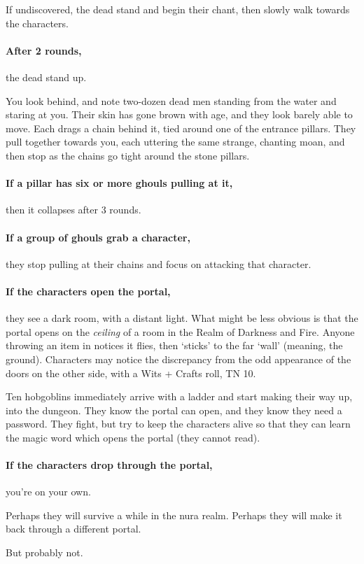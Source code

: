 If undiscovered, the dead stand and begin their chant, then slowly walk towards the characters.

\paragraph{After 2 rounds,}
the dead stand up.

\begin{boxtext}

  You look behind, and note two-dozen dead men standing from the water and staring at you.
  Their skin has gone brown with age, and they look barely able to move.
  Each drags a chain behind it, tied around one of the entrance pillars.
  They pull together towards you, each uttering the same strange, chanting moan, and then stop as the chains go tight around the stone pillars.

\end{boxtext}

\paragraph{If a pillar has six or more ghouls pulling at it,}
then it collapses after 3 rounds.

\paragraph{If a group of ghouls grab a character,}
they stop pulling at their chains and focus on attacking that character.

\paragraph{If the characters open the portal,}
they see a dark room, with a distant light.
What might be less obvious is that the portal opens on the \emph{ceiling} of a room in the Realm of Darkness and Fire.
Anyone throwing an item in notices it flies, then `sticks' to the far `wall' (meaning, the ground).
Characters may notice the discrepancy from the odd appearance of the doors on the other side, with a Wits + Crafts roll, TN 10.

Ten hobgoblins immediately arrive with a ladder and start making their way up, into the dungeon.
They know the portal can open, and they know they need a password.
They fight, but try to keep the characters alive so that they can learn the magic word which opens the portal (they cannot read).

\paragraph{If the characters drop through the portal,}
you're on your own.

Perhaps they will survive a while in the nura realm.
Perhaps they will make it back through a different portal.

But probably not.


